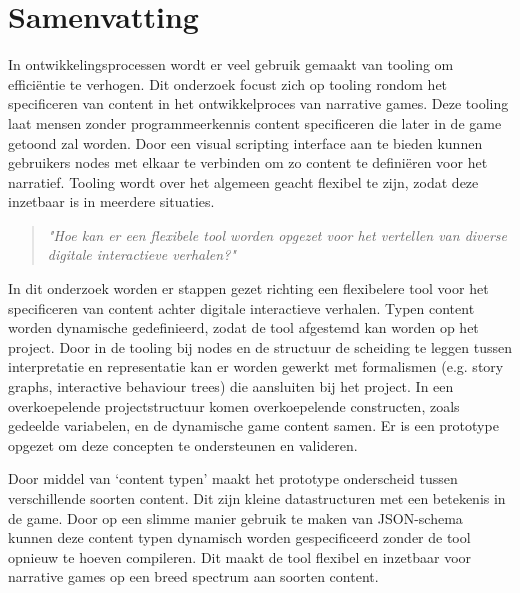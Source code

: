 \chapter*{Samenvatting}
In ontwikkelingsprocessen wordt er veel gebruik gemaakt van tooling om efficiëntie te verhogen. Dit onderzoek focust zich op tooling rondom het specificeren van content in het ontwikkelproces van narrative games. Deze tooling laat mensen zonder programmeerkennis content specificeren die later in de game getoond zal worden. Door een visual scripting interface aan te bieden kunnen gebruikers nodes met elkaar te verbinden om zo content te definiëren voor het narratief.
Tooling wordt over het algemeen geacht flexibel te zijn, zodat deze inzetbaar is in meerdere situaties.
\begin{quote} 
    \centering
    \large
    \textit{
        "Hoe kan er een flexibele tool worden opgezet voor het vertellen van diverse digitale interactieve verhalen?"
    }
\end{quote}

\noindent In dit onderzoek worden er stappen gezet richting een flexibelere tool voor het specificeren van content achter digitale interactieve verhalen. Typen content worden dynamische gedefinieerd, zodat de tool afgestemd kan worden op het project. Door in de tooling bij nodes en de structuur de scheiding te leggen tussen interpretatie en representatie kan er worden gewerkt met formalismen (e.g. story graphs, interactive behaviour trees) die aansluiten bij het project. In een overkoepelende projectstructuur komen overkoepelende constructen, zoals gedeelde variabelen, en de dynamische game content samen. Er is een prototype opgezet om deze concepten te ondersteunen en valideren.
%

Door middel van ‘content typen’ maakt het prototype onderscheid tussen verschillende soorten content. Dit zijn kleine datastructuren met een betekenis in de game. Door op een slimme manier gebruik te maken van JSON-schema kunnen deze content typen dynamisch worden gespecificeerd zonder de tool opnieuw te hoeven compileren. Dit maakt de tool flexibel en inzetbaar voor narrative games op een breed spectrum aan soorten content.

